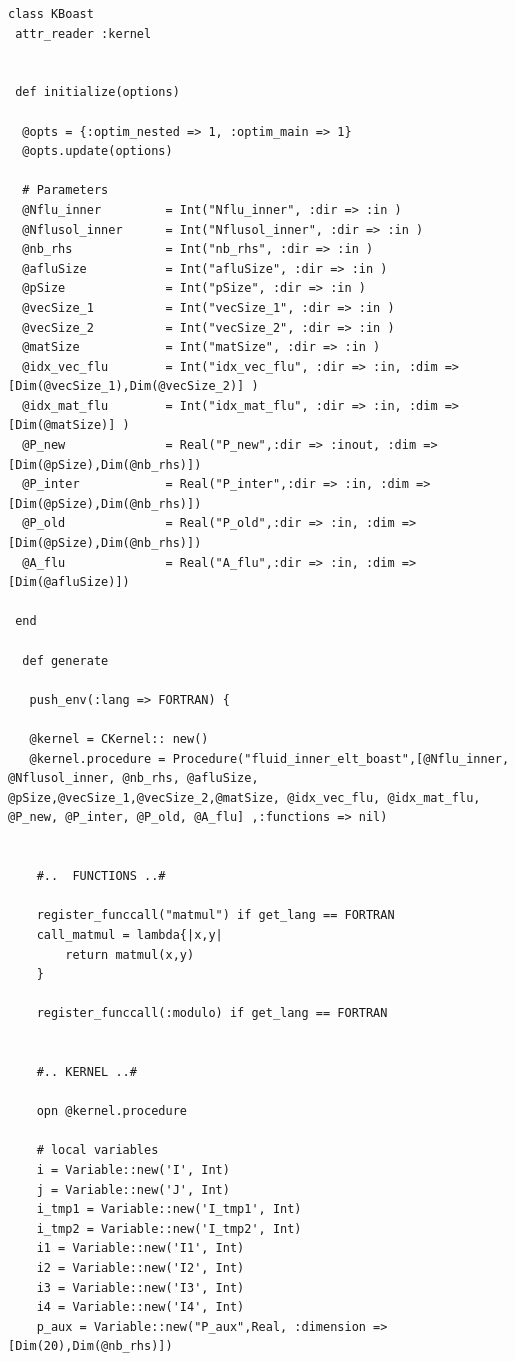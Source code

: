 \documentclass[10pt,twoside]{article}   	%
\begin{document}
\lstset{language=RUBY}
\begin{lstlisting}[caption=KBoast.rb]
class KBoast
 attr_reader :kernel


 def initialize(options)

  @opts = {:optim_nested => 1, :optim_main => 1}
  @opts.update(options)

  # Parameters 
  @Nflu_inner         = Int("Nflu_inner", :dir => :in )
  @Nflusol_inner      = Int("Nflusol_inner", :dir => :in )
  @nb_rhs             = Int("nb_rhs", :dir => :in )
  @afluSize           = Int("afluSize", :dir => :in )
  @pSize              = Int("pSize", :dir => :in )
  @vecSize_1          = Int("vecSize_1", :dir => :in )
  @vecSize_2          = Int("vecSize_2", :dir => :in )
  @matSize            = Int("matSize", :dir => :in )
  @idx_vec_flu        = Int("idx_vec_flu", :dir => :in, :dim => [Dim(@vecSize_1),Dim(@vecSize_2)] )
  @idx_mat_flu        = Int("idx_mat_flu", :dir => :in, :dim => [Dim(@matSize)] )
  @P_new              = Real("P_new",:dir => :inout, :dim => [Dim(@pSize),Dim(@nb_rhs)])
  @P_inter            = Real("P_inter",:dir => :in, :dim => [Dim(@pSize),Dim(@nb_rhs)])
  @P_old              = Real("P_old",:dir => :in, :dim => [Dim(@pSize),Dim(@nb_rhs)])
  @A_flu              = Real("A_flu",:dir => :in, :dim => [Dim(@afluSize)])

 end
 
  def generate

   push_env(:lang => FORTRAN) {

   @kernel = CKernel:: new()
   @kernel.procedure = Procedure("fluid_inner_elt_boast",[@Nflu_inner, @Nflusol_inner, @nb_rhs, @afluSize, @pSize,@vecSize_1,@vecSize_2,@matSize, @idx_vec_flu, @idx_mat_flu, @P_new, @P_inter, @P_old, @A_flu] ,:functions => nil)


    #..  FUNCTIONS ..#

    register_funccall("matmul") if get_lang == FORTRAN
    call_matmul = lambda{|x,y|
        return matmul(x,y)
    }

    register_funccall(:modulo) if get_lang == FORTRAN


    #.. KERNEL ..#

    opn @kernel.procedure

    # local variables
    i = Variable::new('I', Int)
    j = Variable::new('J', Int)
    i_tmp1 = Variable::new('I_tmp1', Int)
    i_tmp2 = Variable::new('I_tmp2', Int)
    i1 = Variable::new('I1', Int)
    i2 = Variable::new('I2', Int)
    i3 = Variable::new('I3', Int)
    i4 = Variable::new('I4', Int)
    p_aux = Variable::new("P_aux",Real, :dimension => [Dim(20),Dim(@nb_rhs)])


\end{lstlisting}
\end{document}
